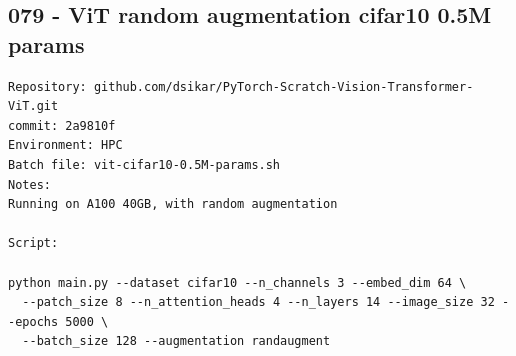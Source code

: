 \subsection{079 - ViT random augmentation cifar10 0.5M params}
\label{app_res:079}
\begin{verbatim}
Repository: github.com/dsikar/PyTorch-Scratch-Vision-Transformer-ViT.git
commit: 2a9810f
Environment: HPC 
Batch file: vit-cifar10-0.5M-params.sh
Notes: 
Running on A100 40GB, with random augmentation

Script:

python main.py --dataset cifar10 --n_channels 3 --embed_dim 64 \
  --patch_size 8 --n_attention_heads 4 --n_layers 14 --image_size 32 --epochs 5000 \
  --batch_size 128 --augmentation randaugment



\end{verbatim}









